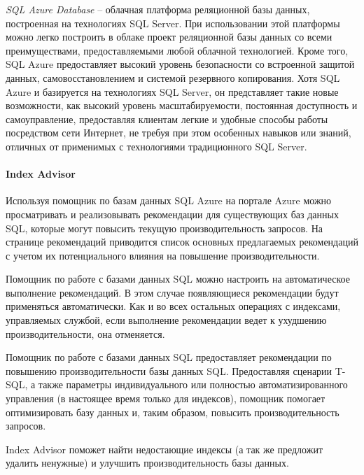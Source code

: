 \textit{SQL Azure Database} – облачная платформа реляционной базы данных, построенная на технологиях SQL Server. При использовании этой платформы можно легко построить в облаке проект реляционной базы данных со всеми преимуществами, предоставляемыми любой облачной технологией. Кроме того, SQL Azure предоставляет высокий уровень безопасности со встроенной защитой данных, самовосстановлением и системой резервного копирования. Хотя SQL Azure и базируется на технологиях SQL Server, он представляет такие новые возможности, как высокий уровень масштабируемости, постоянная доступность и самоуправление, предоставляя клиентам легкие и удобные способы работы посредством сети Интернет, не требуя при этом особенных навыков или знаний, отличных от применимых с технологиями традиционного SQL Server. \cite{habrahabr.ru:sql-azure}


\paragraph{Index Advisor}

Используя помощник по базам данных SQL Azure на портале Azure можно просматривать и реализовывать рекомендации для существующих баз данных SQL, которые могут повысить текущую производительность запросов. На странице рекомендаций приводится список основных предлагаемых рекомендаций с учетом их потенциального влияния на повышение производительности. 

Помощник по работе с базами данных SQL можно настроить на автоматическое выполнение рекомендаций. В этом случае появляющиеся рекомендации будут применяться автоматически. Как и во всех остальных операциях с индексами, управляемых службой, если выполнение рекомендации ведет к ухудшению производительности, она отменяется.

Помощник по работе с базами данных SQL предоставляет рекомендации по повышению производительности базы данных SQL. Предоставляя сценарии T-SQL, а также параметры индивидуального или полностью автоматизированного управления (в настоящее время только для индексов), помощник помогает оптимизировать базу данных и, таким образом, повысить производительность запросов. \cite{docs.microsoft.com:helper-azure}

Index Advisor поможет найти недостающие индексы (а так же предложит удалить ненужные) и улучшить производительность базы данных.
